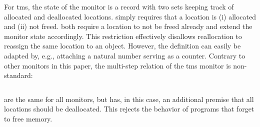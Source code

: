 \documentclass[dvipsnames,conference]{IEEEtran}
\theoremstyle{definition}
\begin{document}
For \gls*{tms}, the state of the monitor is a record with two sets keeping track of allocated and deallocated locations.
 simply requires that a location is (i) allocated and (ii) not freed.
 both require a location to not be freed already and extend the monitor state accordingly.
This restriction effectively disallows reallocation to reassign the same location to an object.
However, the definition can easily be adapted by, e.g., attaching a natural number serving as a counter.
Contrary to other monitors in this paper, the multi-step relation of the \gls*{tms} monitor is non-standard:
\begin{center}
  $\;$\\
\end{center}
 are the same for all monitors, but  has, in this case, an additional premise that all locations should be deallocated.
This rejects the behavior of programs that forget to free memory.
\end{document}
